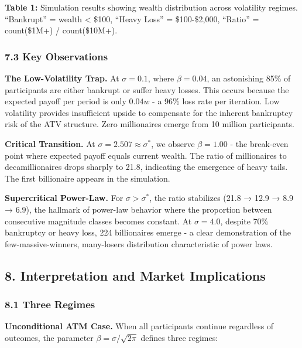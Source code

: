 \documentclass[
  11pt,
  openany]{article}
\begin{document}
\textbf{Table 1:} Simulation results showing wealth distribution across
volatility regimes. ``Bankrupt'' = wealth \textless{} \$100, ``Heavy
Loss'' = \$100-\$2,000, ``Ratio'' = count(\$1M+) / count(\$10M+).

\subsubsection{7.3 Key Observations}\label{key-observations}

\textbf{The Low-Volatility Trap.} At \(\sigma = 0.1\), where
\(\beta = 0.04\), an astonishing 85\% of participants are either
bankrupt or suffer heavy losses. This occurs because the expected payoff
per period is only \(0.04w\) - a 96\% loss rate per iteration. Low
volatility provides insufficient upside to compensate for the inherent
bankruptcy risk of the ATV structure. Zero millionaires emerge from 10
million participants.

\textbf{Critical Transition.} At \(\sigma = 2.507 \approx \sigma^*\), we
observe \(\beta = 1.00\) - the break-even point where expected payoff
equals current wealth. The ratio of millionaires to decamillionaires
drops sharply to 21.8, indicating the emergence of heavy tails. The
first billionaire appears in the simulation.

\textbf{Supercritical Power-Law.} For \(\sigma > \sigma^*\), the ratio
stabilizes (21.8 → 12.9 → 8.9 → 6.9), the hallmark of power-law behavior
where the proportion between consecutive magnitude classes becomes
constant. At \(\sigma = 4.0\), despite 70\% bankruptcy or heavy loss,
224 billionaires emerge - a clear demonstration of the
few-massive-winners, many-losers distribution characteristic of power
laws.

\subsection{8. Interpretation and Market
Implications}\label{interpretation-and-market-implications}

\subsubsection{8.1 Three Regimes}\label{three-regimes}

\textbf{Unconditional ATM Case.} When all participants continue
regardless of outcomes, the parameter \(\beta = \sigma/\sqrt{2\pi}\)
defines three regimes:
\end{document}
